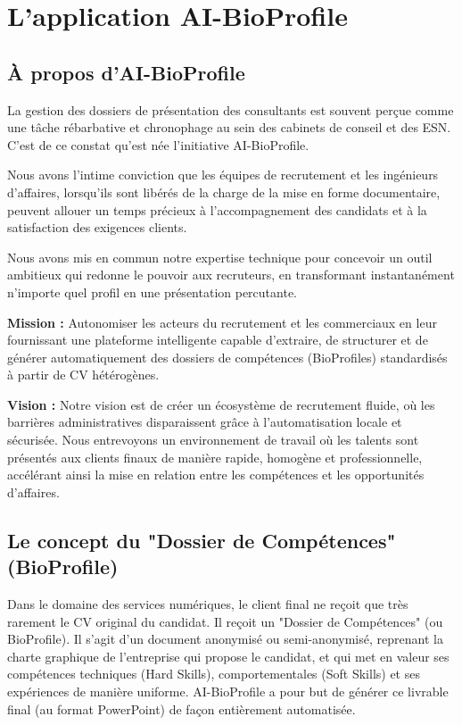 \section{L'application AI-BioProfile}

\subsection{À propos d'AI-BioProfile}
La gestion des dossiers de présentation des consultants est souvent perçue comme une tâche rébarbative et chronophage au sein des cabinets de conseil et des ESN. C'est de ce constat qu'est née l'initiative AI-BioProfile.

Nous avons l'intime conviction que les équipes de recrutement et les ingénieurs d'affaires, lorsqu'ils sont libérés de la charge de la mise en forme documentaire, peuvent allouer un temps précieux à l'accompagnement des candidats et à la satisfaction des exigences clients.

Nous avons mis en commun notre expertise technique pour concevoir un outil ambitieux qui redonne le pouvoir aux recruteurs, en transformant instantanément n'importe quel profil en une présentation percutante.

\textbf{Mission :} Autonomiser les acteurs du recrutement et les commerciaux en leur fournissant une plateforme intelligente capable d'extraire, de structurer et de générer automatiquement des dossiers de compétences (BioProfiles) standardisés à partir de CV hétérogènes.

\textbf{Vision :} Notre vision est de créer un écosystème de recrutement fluide, où les barrières administratives disparaissent grâce à l'automatisation locale et sécurisée. Nous entrevoyons un environnement de travail où les talents sont présentés aux clients finaux de manière rapide, homogène et professionnelle, accélérant ainsi la mise en relation entre les compétences et les opportunités d'affaires.

\subsection{Le concept du "Dossier de Compétences" (BioProfile)}
Dans le domaine des services numériques, le client final ne reçoit que très rarement le CV original du candidat. Il reçoit un "Dossier de Compétences" (ou BioProfile). Il s'agit d'un document anonymisé ou semi-anonymisé, reprenant la charte graphique de l'entreprise qui propose le candidat, et qui met en valeur ses compétences techniques (Hard Skills), comportementales (Soft Skills) et ses expériences de manière uniforme. AI-BioProfile a pour but de générer ce livrable final (au format PowerPoint) de façon entièrement automatisée.


